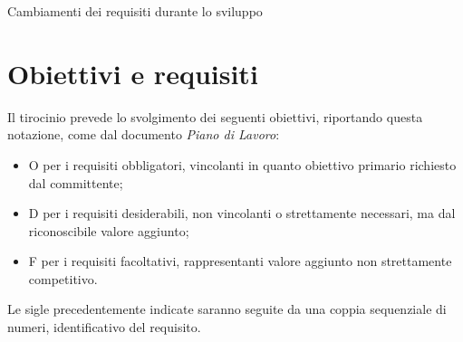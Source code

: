 \clearpage

\begin{risk}{Cambiamenti dei requisiti durante lo sviluppo}
    \newline
    \label{risk:cambiamenti-requisiti}
\end{risk}

\section{Obiettivi e requisiti}\label{sec:obiettivi-requisiti}

Il tirocinio prevede lo svolgimento dei seguenti obiettivi, riportando questa notazione, come dal documento \textit{Piano di Lavoro}:
\begin{itemize}
    \item O per i requisiti obbligatori, vincolanti in quanto obiettivo primario richiesto dal committente;
    \item D per i requisiti desiderabili, non vincolanti o strettamente necessari, ma dal riconoscibile valore aggiunto;
    \item F per i requisiti facoltativi, rappresentanti valore aggiunto non strettamente competitivo.
\end{itemize}
Le sigle precedentemente indicate saranno seguite da una coppia sequenziale di numeri, identificativo del requisito.

